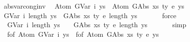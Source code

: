 \begin{isabellebody}
%
\endisatagproof
{\isafoldproof}%
%
\isadelimproof
\isanewline
%
\endisadelimproof
\isanewline
\isanewline
{}\isamarkupfalse%
\ abs{\isacharunderscore}{\kern0pt}var{\isacharunderscore}{\kern0pt}cong{\isacharunderscore}{\kern0pt}inv{\isacharcolon}{\kern0pt}\isanewline
\ \ {\isachardoublequoteopen}{\isasymnot}{\isacharparenleft}{\kern0pt}Atom\ {\isacharparenleft}{\kern0pt}GVar\ i{\isacharparenright}{\kern0pt}\ ys{\isacharprime}{\kern0pt}\ {\isasymsimeq}\ Atom\ {\isacharparenleft}{\kern0pt}GAbs\ xs\ ty{}\ e{\isacharparenright}{\kern0pt}\ ys{\isacharparenright}{\kern0pt}{\isachardoublequoteclose}\isanewline
%
\isadelimproof
%
\endisadelimproof
%
\isatagproof
{}\isamarkupfalse%
\ {\isacharminus}{\kern0pt}\isanewline
\ \ \isamarkupfalse%
\ {\isachardoublequoteopen}{\isasymnot}{\isacharparenleft}{\kern0pt}{\isacharparenleft}{\kern0pt}GVar\ i{\isacharcomma}{\kern0pt}\ length\ ys{\isacharprime}{\kern0pt}{\isacharparenright}{\kern0pt}\ {\isacharequal}{\kern0pt}\ {\isacharparenleft}{\kern0pt}GAbs\ xs\ ty{}\ e{\isacharcomma}{\kern0pt}\ length\ ys{\isacharparenright}{\kern0pt}{\isacharparenright}{\kern0pt}{\isachardoublequoteclose}\isanewline
\ \ \ \ \ \isamarkupfalse%
\ force\isanewline
\ \ \isamarkupfalse%
\ \isamarkupfalse%
\ {\isachardoublequoteopen}{\isasymnot}{\isacharparenleft}{\kern0pt}{\isacharbraceleft}{\kern0pt}{\isacharhash}{\kern0pt}\ {\isacharparenleft}{\kern0pt}GVar\ i{\isacharcomma}{\kern0pt}\ length\ ys{\isacharprime}{\kern0pt}{\isacharparenright}{\kern0pt}\ {\isacharhash}{\kern0pt}{\isacharbraceright}{\kern0pt}\ {\isacharequal}{\kern0pt}\ {\isacharbraceleft}{\kern0pt}{\isacharhash}{\kern0pt}\ {\isacharparenleft}{\kern0pt}GAbs\ xs\ ty{}\ e{\isacharcomma}{\kern0pt}\ length\ ys{\isacharparenright}{\kern0pt}\ {\isacharhash}{\kern0pt}{\isacharbraceright}{\kern0pt}{\isacharparenright}{\kern0pt}{\isachardoublequoteclose}\isanewline
\ \ \ \ \isamarkupfalse%
\ simp\isanewline
\ \ \isamarkupfalse%
\ \isamarkupfalse%
\ {\isachardoublequoteopen}{\isasymnot}\ f{\isacharunderscore}{\kern0pt}of\ {\isacharparenleft}{\kern0pt}Atom\ {\isacharparenleft}{\kern0pt}GVar\ i{\isacharparenright}{\kern0pt}\ ys{\isacharprime}{\kern0pt}{\isacharparenright}{\kern0pt}\ {\isacharequal}{\kern0pt}\ f{\isacharunderscore}{\kern0pt}of\ {\isacharparenleft}{\kern0pt}Atom\ {\isacharparenleft}{\kern0pt}GAbs\ xs\ ty{}\ e{\isacharparenright}{\kern0pt}\ ys{\isacharparenright}{\kern0pt}{\isachardoublequoteclose}\isanewline

\end{isabellebody}
